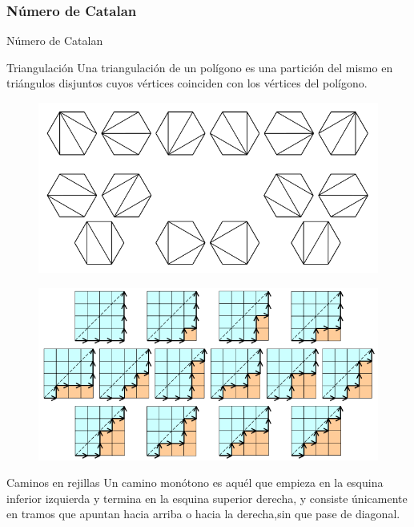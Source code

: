 \subsubsection{Número de Catalan}

\begin{frame}{Número de Catalan}
\begin{minipage}{6cm}
	\begin{block}{Triangulación}
	Una triangulación de un polígono es una partición del mismo en triángulos disjuntos cuyos vértices coinciden con los vértices del polígono.
	\end{block}
\end{minipage}
\begin{minipage}{5cm}
\begin{figure}
	\centering
	\includegraphics[scale=0.25]{ca1}	
\end{figure}


\end{minipage}
\begin{minipage}{6cm}
		\begin{figure}
			\centering
			\includegraphics[height=0.3\paperheight]{ca(1)}
		\end{figure}
\end{minipage}
\begin{minipage}{5.5cm}
	\begin{block}{Caminos en rejillas}
		 Un camino monótono es aquél que empieza en la esquina inferior izquierda y termina en la esquina superior derecha, y consiste únicamente en tramos que apuntan hacia arriba o hacia la derecha,sin que pase de diagonal.
	\end{block}
\end{minipage}
\end{frame}